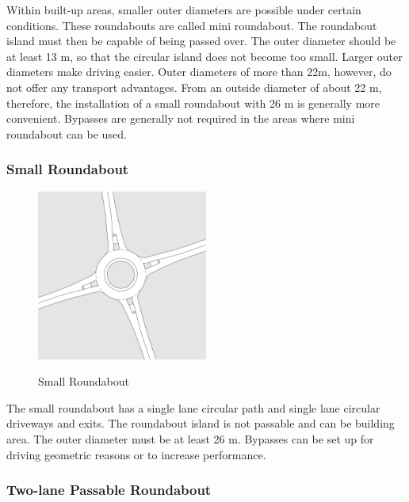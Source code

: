 Within built-up areas, smaller outer diameters are possible under certain conditions.
These roundabouts are called mini roundabout. The roundabout island must then be capable of being passed over.
The outer diameter should be at least 13 m, so that the circular island does not become too small.
Larger outer diameters make driving easier. Outer diameters of more than 22m, however, do not offer any transport advantages.
From an outside diameter of about 22 m, therefore, the installation of a small roundabout with 26 m is generally more convenient.
Bypasses are generally not required in the areas where mini roundabout can be used.\cite{man06}


\subsubsection{Small Roundabout}
\label{smal_roundabout}

\begin{figure}[!ht]
\caption{Small Roundabout \cite{man06}}
\includegraphics[width=0.5\textwidth]{bilder/small_roundabout.png} %
\label{roundabout_small}
\end{figure}

The small roundabout has a single lane circular path and single lane circular driveways and exits. The roundabout island is not passable and can be building area.
The outer diameter must be at least 26 m. Bypasses can be set up for driving geometric reasons or to increase performance.\cite{man06}


\subsubsection{Two-lane Passable Roundabout}

